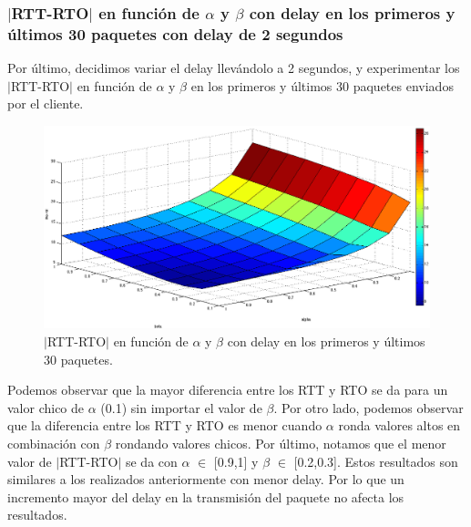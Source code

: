 \documentclass[10pt, a4paper]{article}
\begin{document}
\subsubsection{$|$RTT-RTO$|$ en función de $\alpha$ y $\beta$ con delay en los primeros y últimos 30 paquetes con delay de 2 segundos}
Por último, decidimos variar el delay llevándolo a 2 segundos, y experimentar los $|$RTT-RTO$|$ en función de $\alpha$ y $\beta$ en los primeros y últimos 30 paquetes enviados por el cliente.

\begin{figure}[H]
\begin{center}
\includegraphics[width=17cm]{delay-30F30L-2seg.png}
\caption{$|$RTT-RTO$|$ en función de $\alpha$ y $\beta$ con delay en los primeros y últimos 30 paquetes.}
\end{center}
\end{figure}


Podemos observar que la mayor diferencia entre los RTT y RTO se da para un valor chico de $\alpha$ (0.1) sin importar el valor de $\beta$.
Por otro lado, podemos observar que la diferencia entre los RTT y RTO es menor cuando $\alpha$ ronda valores altos en combinación con $\beta$ rondando valores chicos.
Por último, notamos que el menor valor de $|$RTT-RTO$|$ se da con $\alpha$ $\in$ [0.9,1] y $\beta$ $\in$ [0.2,0.3].
Estos resultados son similares a los realizados anteriormente con menor delay. Por lo que un incremento mayor del delay en la transmisión del paquete no afecta los resultados.
\end{document}

